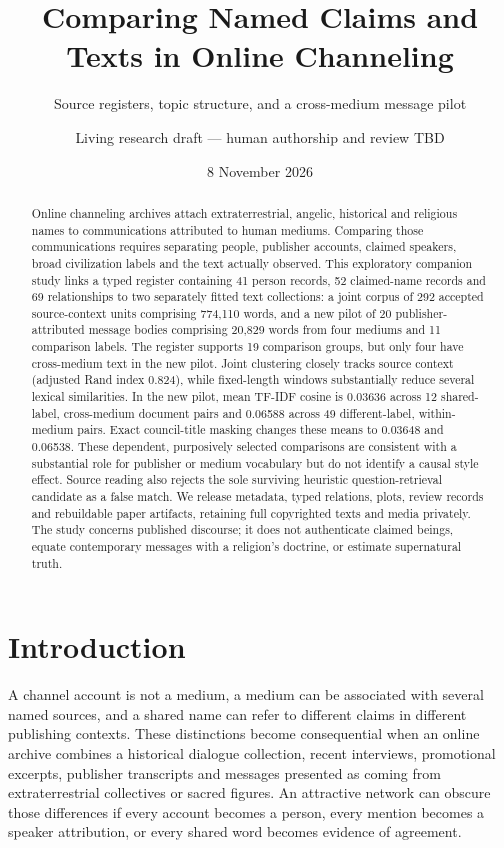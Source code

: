 \documentclass[
  11pt,
]{article}
\title{Comparing Named Claims and Texts in Online Channeling}
\subtitle{Source registers, topic structure, and a cross-medium message
pilot}
\author{Living research draft --- human authorship and review TBD}
\date{8 November 2026}
\begin{document}
\maketitle
\begin{abstract}
Online channeling archives attach extraterrestrial, angelic, historical
and religious names to communications attributed to human mediums.
Comparing those communications requires separating people, publisher
accounts, claimed speakers, broad civilization labels and the text
actually observed. This exploratory companion study links a typed
register containing 41 person records, 52 claimed-name records and 69
relationships to two separately fitted text collections: a joint corpus
of 292 accepted source-context units comprising 774,110 words, and a new
pilot of 20 publisher-attributed message bodies comprising 20,829 words
from four mediums and 11 comparison labels. The register supports 19
comparison groups, but only four have cross-medium text in the new
pilot. Joint clustering closely tracks source context (adjusted Rand
index 0.824), while fixed-length windows substantially reduce several
lexical similarities. In the new pilot, mean TF-IDF cosine is 0.03636
across 12 shared-label, cross-medium document pairs and 0.06588 across
49 different-label, within-medium pairs. Exact council-title masking
changes these means to 0.03648 and 0.06538. These dependent, purposively
selected comparisons are consistent with a substantial role for
publisher or medium vocabulary but do not identify a causal style
effect. Source reading also rejects the sole surviving heuristic
question-retrieval candidate as a false match. We release metadata,
typed relations, plots, review records and rebuildable paper artifacts,
retaining full copyrighted texts and media privately. The study concerns
published discourse; it does not authenticate claimed beings, equate
contemporary messages with a religion's doctrine, or estimate
supernatural truth.
\end{abstract}

\FloatBarrier

\section{Introduction}\label{introduction}

A channel account is not a medium, a medium can be associated with
several named sources, and a shared name can refer to different claims
in different publishing contexts. These distinctions become
consequential when an online archive combines a historical dialogue
collection, recent interviews, promotional excerpts, publisher
transcripts and messages presented as coming from extraterrestrial
collectives or sacred figures. An attractive network can obscure those
differences if every account becomes a person, every mention becomes a
speaker attribution, or every shared word becomes evidence of agreement.
\end{document}
